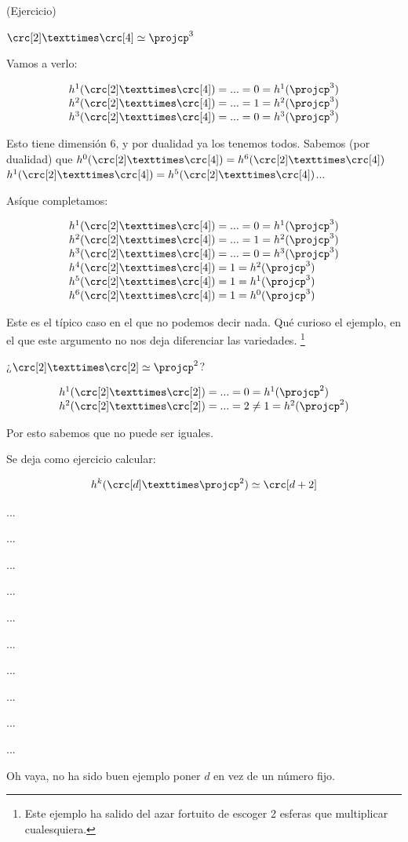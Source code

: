 \documentclass[palatino, bibnumbers]{apuntes}
\begin{document}
\begin{example} (Ejercicio)

$\crc[2]×\crc[4]\simeq \projcp^3$

Vamos a verlo:

\[
	\begin{array}{l}
		h^1(\crc[2]×\crc[4]) = ... = 0 = h^1(\projcp^3)\\
		h^2(\crc[2]×\crc[4]) = ... = 1 = h^2(\projcp^3)\\
		h^3(\crc[2]×\crc[4]) = ... = 0 = h^3(\projcp^3)\\
	\end{array}
\]

Esto tiene dimensión 6, y por dualidad ya los tenemos todos. Sabemos (por dualidad) que $h^0(\crc[2]×\crc[4]) = h^6(\crc[2]×\crc[4])$ $h^1(\crc[2]×\crc[4])=h^5(\crc[2]×\crc[4])$...

Asíque completamos:


\[
	\begin{array}{l}
		h^1(\crc[2]×\crc[4]) = ... = 0 = h^1(\projcp^3)\\
		h^2(\crc[2]×\crc[4]) = ... = 1 = h^2(\projcp^3)\\
		h^3(\crc[2]×\crc[4]) = ... = 0 = h^3(\projcp^3)\\
		h^4(\crc[2]×\crc[4]) = 1 = h^2(\projcp^3)\\
		h^5(\crc[2]×\crc[4]) = 1 = h^1(\projcp^3)\\
		h^6(\crc[2]×\crc[4]) = 1 = h^0(\projcp^3)
	\end{array}
\]

Este es el típico caso en el que no podemos decir nada.
%
Qué curioso el ejemplo, en el que este argumento no nos deja diferenciar las variedades. \footnote{Este ejemplo ha salido del azar fortuito de escoger 2 esferas que multiplicar cualesquiera.}
\end{example}

\begin{example}
¿$\crc[2]×\crc[2] \simeq \projcp^2$?


\[
	\begin{array}{l}
		h^1(\crc[2]×\crc[2]) = ... = 0 = h^1(\projcp^2)\\
		h^2(\crc[2]×\crc[2]) = ... = 2 \neq 1 = h^2(\projcp^2)
	\end{array}
\]

Por esto sabemos que no puede ser iguales.
\end{example}

\begin{example}
Se deja como ejercicio calcular:

\[
h^k(\crc[d]×\projcp^2) \simeq \crc[d+2]
\]

...

...

...

...

...

...

...

...

...

...

Oh vaya, no ha sido buen ejemplo poner $d$ en vez de un número fijo.
\end{example}
\end{document}
